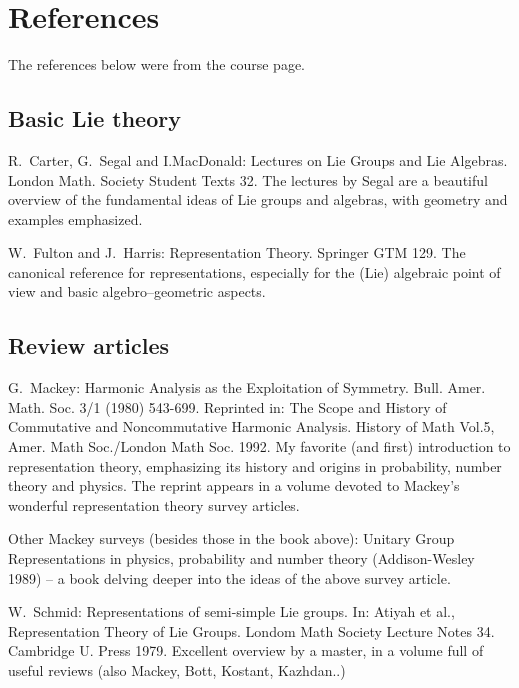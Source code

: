 \documentclass[11pt,leqno]{article}
\theoremstyle{plain}
\theoremstyle{definition}
\numberwithin{equation}{section}
\numberwithin{lem}{section}
\begin{document}

\newpage\section*{References}
The references below were from the course page.
{\footnotesize
\subsection*{\hspace{1em}Basic Lie theory}
 R.~Carter, G.~Segal and I.MacDonald: Lectures on Lie Groups and Lie Algebras. London Math. Society Student Texts 32. The lectures by Segal are a beautiful overview of the fundamental ideas of Lie groups and algebras, with geometry and examples emphasized.

W.~Fulton and J.~Harris: Representation Theory. Springer GTM 129. The canonical reference for representations, especially for the (Lie) algebraic point of view and basic algebro--geometric aspects.
\subsection*{\hspace{1em}Review articles}
G.~Mackey: Harmonic Analysis as the Exploitation of Symmetry. Bull. Amer. Math. Soc. 3/1 (1980) 543-699. Reprinted in: The Scope and History of Commutative and Noncommutative Harmonic Analysis. History of Math Vol.5, Amer. Math Soc./London Math Soc. 1992. My favorite (and first) introduction to representation theory, emphasizing its history and origins in probability, number theory and physics. The reprint appears in a volume devoted to Mackey's wonderful representation theory survey articles.

Other Mackey surveys (besides those in the book above): Unitary Group Representations in physics, probability and number theory (Addison-Wesley 1989) -- a book delving deeper into the ideas of the above survey article.

W.~Schmid: Representations of semi-simple Lie groups. In: Atiyah et al., Representation Theory of Lie Groups. Londom Math Society Lecture Notes 34. Cambridge U. Press 1979. Excellent overview by a master, in a volume full of useful reviews (also Mackey, Bott, Kostant, Kazhdan..)

}
\end{document}
